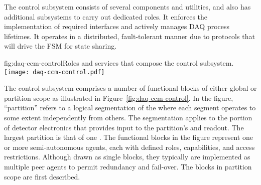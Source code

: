The control subsystem consists of several components and utilities, and also has additional subsystems to carry out dedicated roles. It enforces the implementation of required interfaces and actively manages DAQ process lifetimes. It operates in a distributed, fault-tolerant manner due to protocols that will drive the FSM for state sharing. 

\begin{dunefigure}{fig:daq-ccm-control}{Roles and services that compose the  control subsystem.}
  \texttt{[image: daq-ccm-control.pdf]}
\end{dunefigure}






The control subsystem comprises a number of functional blocks of either global or partition scope as illustrated in Figure~\ref{fig:daq-ccm-control}. 
In the figure, ``partition'' refers to a logical segmentation of the  where each segment operates to some extent independently from others. 
The segmentation applies to the portion of detector electronics that provides input to the partition's  and readout. 
The largest partition %
is that of one . 
The functional blocks in the figure represent one or more semi-autonomous agents, each with defined roles, capabilities, and access restrictions. 
Although drawn as single blocks, they typically are implemented as multiple peer agents to permit redundancy and fail-over. 
The blocks in partition scope are first described.

